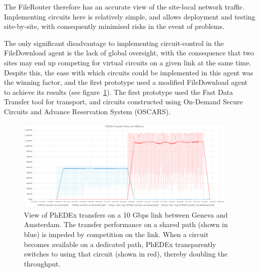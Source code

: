 The FileRouter therefore has an accurate view of the site-local network traffic. Implementing circuits here is relatively simple, and allows deployment and testing site-by-site, with consequently minimised risks in the event of problems.

The only significant disadvantage to implementing circuit-control in the FileDownload agent is the lack of global oversight, with the consequence that two sites may end up competing for virtual circuits on a given link at the same time. Despite this, the ease with which circuits could be implemented in this agent was the winning factor, and the first prototype used a modified FileDownload agent to achieve its results (see figure~\ref{fig:combined_phedex_transfers}). The first prototype used the Fast Data Transfer tool\cite{FDT} for transport, and circuits constructed using On-Demand Secure Circuits and Advance Reservation System (OSCARS\cite{OSCARS}).

\begin{figure}[h]
  \centering
  \includegraphics[width=0.95\textwidth]{figure-FileDownload_All_paths}
  \caption{View of PhEDEx transfers on a 10 Gbps link between Geneva and Amsterdam. The transfer performance on a shared path (shown in blue) is impeded by competition on the link. When a circuit becomes available on a dedicated path, PhEDEx transparently switches to using that circuit (shown in red), thereby doubling the throughput.}
  \label{fig:combined_phedex_transfers}
\end{figure} 

